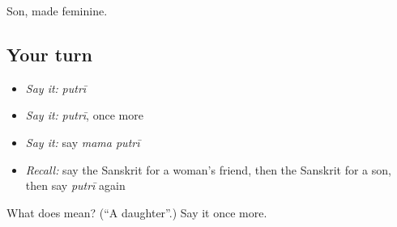 \begin{grammarlens}[title={What you've built}]
Son, made feminine.
\end{grammarlens}

\subsection*{Your turn}
\begin{itemize}
\raggedright
  \item \emph{Say it:} \emph{putrī}
  \item \emph{Say it:} \emph{putrī}, once more
  \item \emph{Say it:} say \emph{mama putrī}
  \item \emph{Recall:} say the Sanskrit for a woman's friend, then the Sanskrit for a son, then say \emph{putrī} again
\end{itemize}

\begin{tcolorbox}[breakable,colback=teal!4,colframe=teal!35!black,title={Before you move on}]
What does  mean? (\textquotedblleft{}A daughter\textquotedblright{}.) Say it once more.
\end{tcolorbox}
